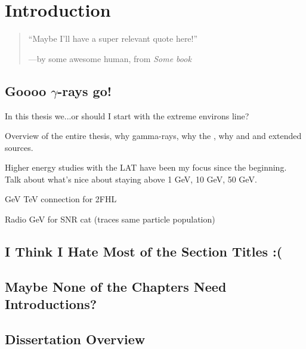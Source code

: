 \chapter{Introduction}
\label{chap:intro}

\begin{quote}
	``Maybe I'll have a super relevant quote here!'' 
	\begin{center}---by some awesome human, from \it{Some book} \end{center}
\end{quote}

\section{Goooo $\gamma$-rays go!}

In this thesis we...or should I start with the extreme environs line?

Overview of the entire thesis, why gamma-rays, why the \lat, why \snr and \pwn and extended sources.

Higher energy studies with the LAT have been my focus since the beginning. Talk about what's nice about staying above 1 GeV, 10 GeV, 50 GeV. 

GeV TeV connection for 2FHL

Radio GeV for SNR cat (traces same particle population)

\section{I Think I Hate Most of the Section Titles :(}

\section{Maybe None of the Chapters Need Introductions?}

\section{Dissertation Overview}


